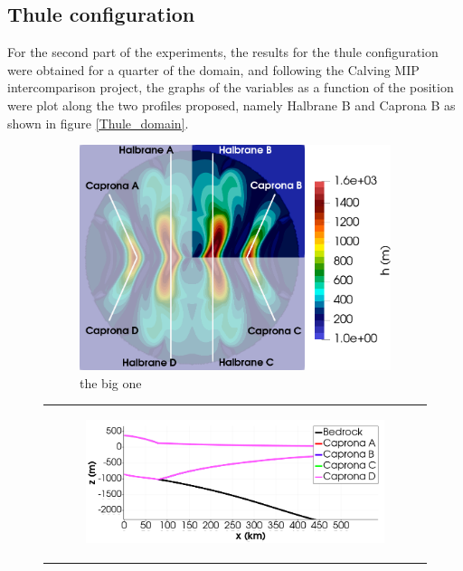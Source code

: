 \documentclass{article}
\begin{document}
\subsection{Thule configuration}
For the second part of the experiments, the results for the thule configuration were obtained for a quarter of the domain, and following the Calving MIP intercomparison project, the graphs of the variables as a function of the position were plot along the two profiles proposed, namely Halbrane B and Caprona B as shown in figure \ref{Thule_domain}.

\begin{figure}[!h]
  \begin{subfigure}[c]{.52\linewidth}
    \centering
    \includegraphics[width=\linewidth]{../fig/Profiles_Thule_combined_domains_2_con_fondo.png}%
    \caption
      {%
        the big one%
        \label{fig:big}%
      }%
  \end{subfigure}\hfill
  \begin{tabular}[c]{@{}c@{}}
    \begin{subfigure}[c]{.48\linewidth}
      \centering
      \includegraphics[width=\linewidth]{../fig/Capronas_Thule_Domain_con_fondo.png}%

\end{subfigure}
\end{tabular}
\end{figure}
\end{document}
